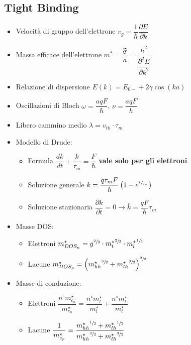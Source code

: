 \documentclass{article}
\begin{document}
\subsection{Tight Binding}
\begin{itemize}
  \item Velocità di gruppo dell'elettrone \( v_g = \dfrac{1}{\hbar} \dfrac{\partial E}{\partial k} \)
  \item Massa efficace dell'elettrone \( m ^ \ast = \dfrac{ \mathfrak{F} }{a} = \dfrac{\hbar ^ 2}{\dfrac{\partial ^ 2 E}{\partial k ^ 2}} \)
  \item Relazione di dispersione \( E(k) = E_{0-} + 2 \gamma \cos(ka) \)
  \item Oscillazioni di Bloch \( \omega = \dfrac{a q F}{\hbar} \), \( \nu = \dfrac{a q F}{h} \)
  \item Libero cammino medio \( \lambda = v_{th} \cdot \tau_m \)
  \item Modello di Drude:
        \begin{itemize}
          \item Formula \( \dfrac{dk}{dt} + \dfrac{k}{\tau_m}= \dfrac{F}{\hbar} \) \textbf{vale solo per gli elettroni}
          \item Soluzione generale \( k = \dfrac{q \tau_m F}{\hbar} \left( 1 - e^{\sfrac{t}{\tau_m}} \right) \)
          \item Soluzione stazionaria \( \dfrac{\partial k}{\partial t} = 0 \rightarrow \bar{k} = \dfrac{q F}{\hbar} \tau_m \)
        \end{itemize}
  \item Masse DOS:
        \begin{itemize}
          \item Elettroni \( m^{\star}_{DOS_n} = g ^ {\sfrac{2}{3}} \cdot {m^\star_t} ^ {\sfrac{2}{3}} \cdot {m^\star_l} ^ {\sfrac{1}{3}}  \)
          \item Lacune \( m^{\star}_{DOS_p} = \left( {m_{hh}^{\star}} ^ {\sfrac{3}{2}} + {m_{lh}^{\star}} ^ {\sfrac{3}{2}} \right) ^ {\sfrac{2}{3}} \)
        \end{itemize}
  \item Masse di conduzione:
        \begin{itemize}
          \item Elettroni \( \dfrac{n^{\circ} m^\star_{c_n}}{m^\star_{c_n}} = \dfrac{n^{\circ} m_l^\star}{m_l^\star} + \dfrac{n^{\circ} m_t^\star}{m_t^\star} \)
          \item Lacune \( \dfrac{1}{m^\star_{c_p}} = \dfrac{{m^\star_{hh}} ^ {\sfrac{1}{2}} + {m^\star_{lh}} ^ {\sfrac{1}{2}} }{{m^\star_{hh}} ^ {\sfrac{3}{2}} + {m^\star_{lh}} ^ {\sfrac{3}{2}} } \)
        \end{itemize}
\end{itemize}
\end{document}
